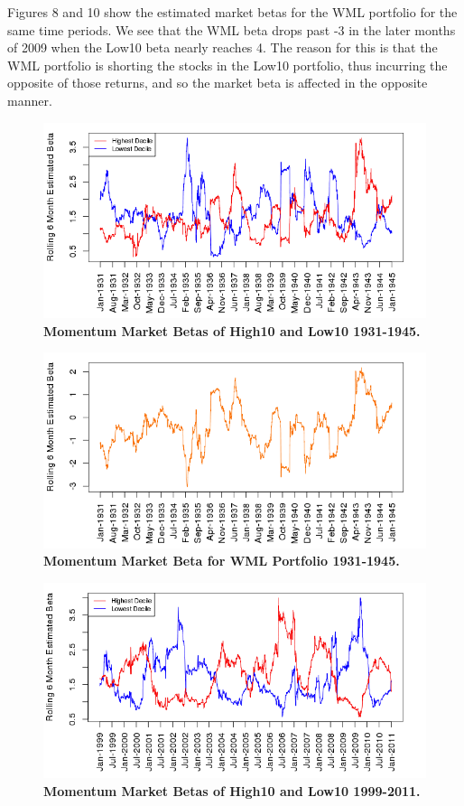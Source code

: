 \documentclass[12pt]{article}
\begin{document}
Figures 8 and 10 show the estimated market betas for the WML portfolio for the same time periods. We see that the WML beta drops past -3 in the later months of 2009 when the Low10 beta nearly reaches 4. The reason for this is that the WML portfolio is shorting the stocks in the Low10 portfolio, thus incurring the opposite of those returns, and so the market beta is affected in the opposite manner.

\begin{figure}[p] %
\centering
\caption{\textbf{Momentum Market Betas of High10 and Low10 1931-1945.}}
\includegraphics[scale=0.6]{betas1931.png}
\end{figure}

\begin{figure}[p]
\centering
\caption{\textbf{Momentum Market Beta for WML Portfolio 1931-1945.}}
\includegraphics[scale=0.6]{betaWML1931.png}
\end{figure}

\begin{figure}[p]
\centering
\caption{\textbf{Momentum Market Betas of High10 and Low10 1999-2011.}}
\includegraphics[scale=0.6]{betas1999.png}
\end{figure}
\end{document}
